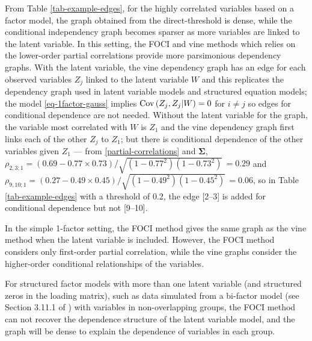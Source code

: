 \documentclass[a4paper]{article}
\def\sigb{{\boldsymbol{\Sigma}}}
\def\Cov{{\rm Cov}\,}
\def\rt#1{\sqrt{#1}\,}
\begin{document}
From Table \ref{tab-example-edges}, for the highly correlated variables based on
a factor model, the graph obtained from the direct-threshold is dense, while the
conditional independency graph becomes sparser as more variables are linked
to the latent variable. 
In this setting, the FOCI and vine methods which relies on the lower-order partial correlations provide more parsimonious dependency graphs.
With the latent variable, the vine dependency graph has an edge for each observed
variables $Z_j$ linked to the latent variable $W$ and this replicates the dependency graph used
in latent variable models and structured equation models; the model \eqref{eq-1factor-gauss} implies $\Cov(Z_j,Z_j|W)=0$ for $i\ne j$ so edges for
conditional dependence are not needed.
Without the latent variable for the graph, the variable most correlated with
$W$ is $Z_1$ and the vine dependency graph first links each of the other
$Z_j$ to $Z_1$; but there is conditional dependence of the other
variables given $Z_1$ --- from 
\eqref{partial-correlations} and 
$\sigb$,
$\rho_{2,3;1}=(0.69-0.77\times0.73)/\rt{(1-0.77^2)(1-0.73^2)}=0.29$ and
$\rho_{9,10;1}=(0.27-0.49\times0.45)/\rt{(1-0.49^2)(1-0.45^2)}=0.06$,
so in Table \ref{tab-example-edges} with a threshold of 0.2, 
the edge [2--3] is added for conditional
dependence but not [9--10].

In the simple 1-factor setting, the FOCI method gives the same graph
as the vine method when the latent variable is included. However, the
FOCI method considers only first-order partial correlation, while the
vine graphs consider the higher-order conditional relationships of the
variables. 

For structured factor models with more than one latent variable (and
structured zeros in the loading matrix), such as data simulated from a
bi-factor model (see Section 3.11.1 of \cite{Joe2014}) with variables
in non-overlapping groups, the FOCI method can not recover the
dependence structure of the latent variable model, and the graph will
be dense to explain the dependence of variables in each group.
\end{document}
